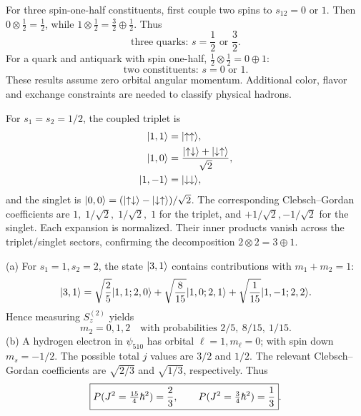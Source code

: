For three spin-one-half constituents,
first couple two spins to $s_{12}=0$ or $1$.
Then $0\otimes\frac12=\frac12$,
while $1\otimes\frac12=\frac32\oplus\frac12$.
Thus
\begin{equation}
\boxed{\text{three quarks: }s=\frac12
\text{ or }\frac32}.
\end{equation}
For a quark and antiquark with spin one-half,
$\frac12\otimes\frac12=0\oplus1$:
\begin{equation}
\boxed{\text{two constituents: }s=0\text{ or }1}.
\end{equation}
These results assume zero orbital angular momentum.
Additional color, flavor and exchange constraints
are needed to classify physical hadrons.

For $s_1=s_2=1/2$, the coupled triplet is
\begin{align}
\lvert 1,1\rangle&=\lvert \uparrow\uparrow\rangle,\\
\lvert 1,0\rangle&=\frac{\lvert \uparrow\downarrow\rangle+
\lvert \downarrow\uparrow\rangle}{\sqrt2},\\
\lvert 1,-1\rangle&=\lvert \downarrow\downarrow\rangle,
\end{align}
and the singlet is
$\lvert 0,0\rangle=(\lvert \uparrow\downarrow\rangle-
\lvert \downarrow\uparrow\rangle)/\sqrt2$.
The corresponding Clebsch--Gordan coefficients
are $1,\;1/\sqrt2,\;1/\sqrt2,\;1$
for the triplet, and $+1/\sqrt2,-1/\sqrt2$
for the singlet. Each expansion is normalized.
Their inner products vanish across the
triplet/singlet sectors, confirming the
decomposition $2\otimes2=3\oplus1$.

(a) For $s_1=1,s_2=2$, the state $\lvert 3,1\rangle$
contains contributions with
$m_1+m_2=1$:
\begin{equation}
\lvert 3,1\rangle=
\sqrt{\frac25}\lvert 1,1;2,0\rangle
+\sqrt{\frac8{15}}\lvert 1,0;2,1\rangle
+\sqrt{\frac1{15}}\lvert 1,-1;2,2\rangle.
\end{equation}
Hence measuring $S_z^{(2)}$ yields
\begin{equation}
\boxed{m_2=0,1,2\quad\text{with probabilities }
2/5,\ 8/15,\ 1/15}.
\end{equation}
(b) A hydrogen electron in $\psi_{510}$
has orbital $\ell=1,m_\ell=0$; with spin
down $m_s=-1/2$. The possible total
$j$ values are $3/2$ and $1/2$.
The relevant Clebsch--Gordan coefficients
are $\sqrt{2/3}$ and $\sqrt{1/3}$,
respectively. Thus
\begin{equation}
\boxed{P(J^2=\tfrac{15}{4}\hbar^2)=\frac23,\qquad
P(J^2=\tfrac34\hbar^2)=\frac13}.
\end{equation}

